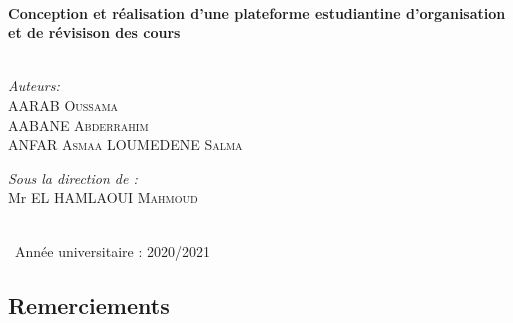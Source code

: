 \documentclass{article}
\begin{document}
\begin{titlepage}
\HRule \\[0.4cm]
{ \huge \bfseries Conception et réalisation d'une plateforme estudiantine d'organisation et de révisison des cours}\\[0.4cm] %
\HRule \\[1cm]
 
\vspace{1.2cm}
\begin{minipage}{0.4\textwidth}
\begin{flushleft} \large
\emph{Auteurs:}\\
   AARAB\textsc{	Oussama} \\
   AABANE\textsc{	Abderrahim} \\
   ANFAR\textsc{	Asmaa}
   LOUMEDENE\textsc{	Salma}\\
\emph{}

\end{flushleft}
\end{minipage}
\begin{minipage}{0.5\textwidth}
\begin{flushright} \large
\emph{Sous la direction de :} \\
Mr EL HAMLAOUI  \textsc{Mahmoud} 
\end{flushright}
\end{minipage}\\[5cm]

{\large \  Année universitaire : 2020/2021}\\[0.5cm] %

\vfill %

\end{titlepage}
\begin{center}
\centering
    \hspace{4cm}\section*{Remerciements}
\end{center}
\end{document}
